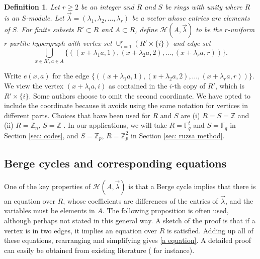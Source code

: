 \documentclass[12pt]{article}%
\newtheorem{definition}[theorem]{Definition}
\begin{document}
\begin{definition} 
Let $r \geq 2$ be an integer and $R$ and $S$ be rings with unity where $R$ is an $S$-module.    
Let $\vec{ \lambda} = ( \lambda_1 , \lambda_2 , \dots , \lambda_r)$ be a vector whose entries are elements of $S$. 
For finite subsets $R' \subset R$ and $A \subset R$, 
define $\mathcal{H}( A , \vec{ \lambda } )$ to be the $r$-uniform $r$-partite hypergraph with vertex set 
$\cup_{i=1}^r ( R' \times \{ i \} )$ 
and edge set 
\[
\bigcup_{x \in R' ,a \in A } \{ \left( ( x + \lambda_1 a ,1) 
, ( x+ \lambda_2 a ,2 ) ,  \dots , 
 (x  + \lambda_r a , r ) \right) \}.  
\]
\end{definition}

Write $e(x,a)$ for the edge $\{ ( ( x + \lambda_1 a ,1) , ( x + \lambda_2 a , 2  ) , \dots , ( x + \lambda_r a ,r ) ) \}$.  We view the vertex $(x + \lambda_i a , i)$ as contained in the $i$-th copy of $R'$, which is $R' \times \{i \}$.  Some authors choose to omit the second coordinate.  We have opted to include the coordinate because it avoids using the same notation for vertices in different parts.   
Choices that have been used for $R$ and $S$ are  
(i) $R = S = \mathbb{Z}$ \cite{alon, alonFischerSzegedy, Ge} and 
(ii) $R = \mathbb{Z}_n$, $S = \mathbb{Z}$ \cite{Ge-Hash, LV}.   
In our applications, we will take $R= \mathbb{F}_q^t$ and $S = \mathbb{F}_q$ in Section \ref{sec: codes}, 
and $S = \mathbb{Z}_p$, $R = \mathbb{Z}_p^2$ in Section \ref{sec: ruzsa method}.  

\subsection{Berge cycles and corresponding equations}

One of the key properties of $\mathcal{H}( A , \vec{ \lambda})$ is that a Berge cycle implies 
that there is an equation over $R$, whose coefficients are differences of the entries of $\vec{ \lambda}$, and 
the variables must be elements in $A$.  The following proposition is often used, although perhaps not stated in this general way.  A sketch of the proof is that if a vertex is in two edges, it implies an equation over $R$ is satisfied. Adding up all of these equations, rearranging and simplifying gives \eqref{a equation}.
A detailed proof can easily be obtained from existing literature (\cite{Ge} for instance).  
\end{document}
